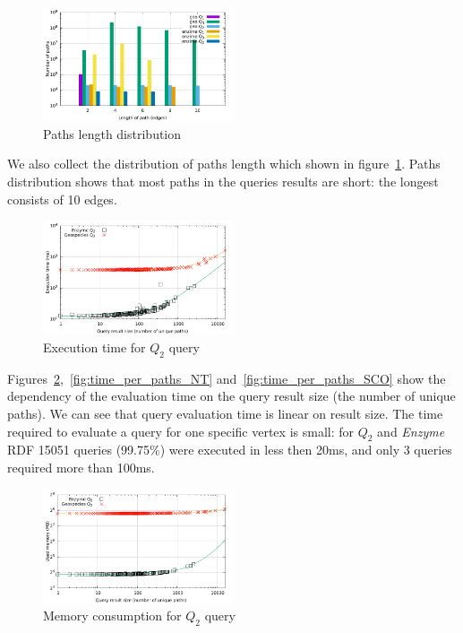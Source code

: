 {
\setlength{\belowcaptionskip}{-10pt}
\begin{figure}[h]
  \begin{center}
    \includegraphics[width=0.5\textwidth]{data/path_per_length.pdf}
    \caption{Paths length distribution}\label{fig:pLength}
  \end{center}
\end{figure}
}
We also collect the distribution of paths length which shown in figure~\ref{fig:pLength}.
Paths distribution shows that most paths in the queries results are short: the longest consists of 10 edges.
{
\setlength{\belowcaptionskip}{-10pt}
\begin{figure}[h]
  \begin{center}
    \includegraphics[width=0.5\textwidth]{data/time_per_paths_BT.pdf}
    \caption{Execution time for $Q_2$ query}
    \label{fig:time_per_paths_BT}
  \end{center}
\end{figure}
\vspace{-0.2cm}
}
Figures~\ref{fig:time_per_paths_BT},~\ref{fig:time_per_paths_NT} and~\ref{fig:time_per_paths_SCO} show the dependency of the evaluation time on the query result size (the number of unique paths).
We can see that query evaluation time is linear on result size.
The time required to evaluate a query for one specific vertex is small: for $Q_2$ and \emph{Enzyme} RDF 15051 queries (99.75\%) were executed in less then 20ms, and only 3 queries required more than 100ms.
{
\setlength{\belowcaptionskip}{-10pt}
\begin{figure}[ht]
  \begin{center}
    \includegraphics[width=0.5\textwidth]{data/mem_per_paths_BT.pdf}
    \caption{Memory consumption for $Q_2$ query}
    \label{fig:mem_per_paths_BT}
  \end{center}
\end{figure}
}
